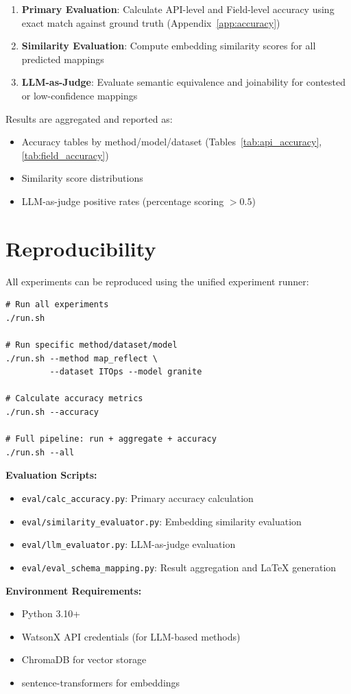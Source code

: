 \documentclass[sigconf, nonacm]{acmart}
\begin{document}
\begin{enumerate}
    \item \textbf{Primary Evaluation}: Calculate API-level and Field-level accuracy using exact match against ground truth (Appendix~\ref{app:accuracy})
    \item \textbf{Similarity Evaluation}: Compute embedding similarity scores for all predicted mappings
    \item \textbf{LLM-as-Judge}: Evaluate semantic equivalence and joinability for contested or low-confidence mappings
\end{enumerate}

Results are aggregated and reported as:
\begin{itemize}
    \item Accuracy tables by method/model/dataset (Tables~\ref{tab:api_accuracy}, \ref{tab:field_accuracy})
    \item Similarity score distributions
    \item LLM-as-judge positive rates (percentage scoring $> 0.5$)
\end{itemize}

\section{Reproducibility}
\label{app:reproducibility}

All experiments can be reproduced using the unified experiment runner:

\begin{verbatim}
# Run all experiments
./run.sh

# Run specific method/dataset/model
./run.sh --method map_reflect \
         --dataset ITOps --model granite

# Calculate accuracy metrics
./run.sh --accuracy

# Full pipeline: run + aggregate + accuracy
./run.sh --all
\end{verbatim}

\textbf{Evaluation Scripts:}
\begin{itemize}
    \item \texttt{eval/calc\_accuracy.py}: Primary accuracy calculation
    \item \texttt{eval/similarity\_evaluator.py}: Embedding similarity evaluation
    \item \texttt{eval/llm\_evaluator.py}: LLM-as-judge evaluation
    \item \texttt{eval/eval\_schema\_mapping.py}: Result aggregation and LaTeX generation
\end{itemize}

\textbf{Environment Requirements:}
\begin{itemize}
    \item Python 3.10+
    \item WatsonX API credentials (for LLM-based methods)
    \item ChromaDB for vector storage
    \item sentence-transformers for embeddings
\end{itemize}

\clearpage


\end{document}
